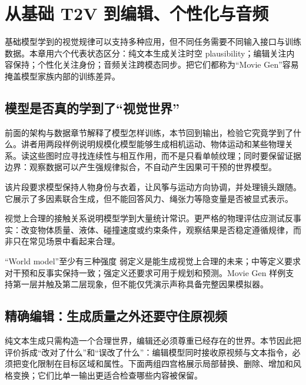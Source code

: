 \section{从基础 T2V 到编辑、个性化与音频}

基础模型学到的视觉规律可以支持多种应用，但不同任务需要不同输入接口与训练数据。本章用六个代表状态区分：纯文本生成关注时空 plausibility；编辑关注内容保持；个性化关注身份；音频关注跨模态同步。把它们都称为“Movie Gen”容易掩盖模型家族内部的训练差异。

\subsection{模型是否真的学到了“视觉世界”}

前面的架构与数据章节解释了模型怎样训练，本节回到输出，检验它究竟学到了什么。讲者用两段样例说明规模化模型能够生成相机运动、物体运动和某些物理关系。读这些图时应寻找连续性与相互作用，而不是只看单帧纹理；同时要保留证据边界：观察数据可以产生强规律拟合，不自动产生因果可干预的世界模型。


该片段要求模型保持人物身份与衣着，让风筝与运动方向协调，并处理镜头跟随。它展示了多因素联合生成，但不能回答风力、绳张力等隐变量是否被显式表示。


视觉上合理的接触关系说明模型学到大量统计常识。更严格的物理评估应测试反事实：改变物体质量、液体、碰撞速度或约束条件，观察结果是否稳定遵循规律，而非只在常见场景中看起来合理。

\begin{warningbox}{“World model”至少有三种强度}
弱定义是能生成视觉上合理的未来；中等定义要求对干预和反事实保持一致；强定义还要求可用于规划和预测。Movie Gen 样例支持第一层并触及第二层现象，但不能仅凭演示声称具备完整因果模拟器。
\end{warningbox}


\subsection{精确编辑：生成质量之外还要守住原视频}

纯文本生成只需构造一个合理世界，编辑还必须尊重已经存在的世界。本节因此把评价拆成“改对了什么”和“误改了什么”：编辑模型同时接收原视频与文本指令，必须把变化限制在目标区域和属性。下面两组四宫格展示局部替换、删除、增加和风格变换；它们比单一输出更适合检查哪些内容被保留。

